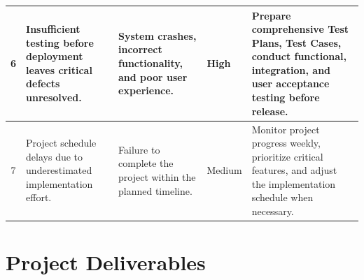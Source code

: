 \documentclass[12pt,a4paper]{article}
\begin{document}
\begin{longtable}{|c|p{3.5cm}|p{3.8cm}|p{1.8cm}|p{4.5cm}|}
	6 &
	Insufficient testing before deployment leaves critical defects unresolved. &
	System crashes, incorrect functionality, and poor user experience. &
	High &
	Prepare comprehensive Test Plans, Test Cases, conduct functional, integration, and user acceptance testing before release.\\
	\hline
	
	7 &
	Project schedule delays due to underestimated implementation effort. &
	Failure to complete the project within the planned timeline. &
	Medium &
	Monitor project progress weekly, prioritize critical features, and adjust the implementation schedule when necessary.\\
	\hline
	
\end{longtable}
	\section{Project Deliverables}
\end{document}
